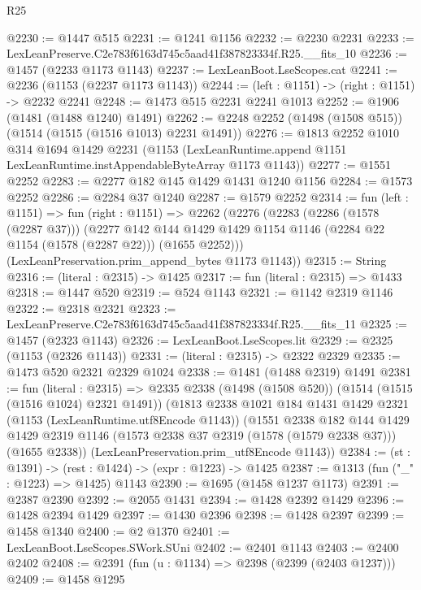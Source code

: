 \begin{lexlean}{R25}
\begin{coremodule}
@2230 := @1447 @515
@2231 := @1241 @1156
@2232 := @2230 @2231
@2233 := LexLeanPreserve.C2e783f6163d745c5aad41f387823334f.R25.__fits_10
@2236 := @1457 (@2233 @1173 @1143)
@2237 := LexLeanBoot.LseScopes.cat
@2241 := @2236 (@1153 (@2237 @1173 @1143))
@2244 := (left : @1151) -> (right : @1151) -> @2232 @2241
@2248 := @1473 @515 @2231 @2241 @1013
@2252 := @1906 (@1481 (@1488 @1240) @1491)
@2262 := @2248 @2252 (@1498 (@1508 @515)) (@1514 (@1515 (@1516 @1013) @2231 @1491))
@2276 := @1813
    @2252
    @1010
    @314
    @1694
    @1429
    @2231
    (@1153 (LexLeanRuntime.append @1151 LexLeanRuntime.instAppendableByteArray @1173 @1143))
@2277 := @1551 @2252
@2283 := @2277 @182 @145 @1429 @1431 @1240 @1156
@2284 := @1573 @2252
@2286 := @2284 @37 @1240
@2287 := @1579 @2252
@2314 := fun (left : @1151) =>
  fun (right : @1151) =>
  @2262
    (@2276
      (@2283
        (@2286 (@1578 (@2287 @37)))
        (@2277
          @142
          @144
          @1429
          @1429
          @1154
          @1146
          (@2284 @22 @1154 (@1578 (@2287 @22)))
          (@1655 @2252)))
      (LexLeanPreservation.prim_append_bytes @1173 @1143))
@2315 := String
@2316 := (literal : @2315) -> @1425
@2317 := fun (literal : @2315) => @1433
@2318 := @1447 @520
@2319 := @524 @1143
@2321 := @1142 @2319 @1146
@2322 := @2318 @2321
@2323 := LexLeanPreserve.C2e783f6163d745c5aad41f387823334f.R25.__fits_11
@2325 := @1457 (@2323 @1143)
@2326 := LexLeanBoot.LseScopes.lit
@2329 := @2325 (@1153 (@2326 @1143))
@2331 := (literal : @2315) -> @2322 @2329
@2335 := @1473 @520 @2321 @2329 @1024
@2338 := @1481 (@1488 @2319) @1491
@2381 := fun (literal : @2315) =>
  @2335
    @2338
    (@1498 (@1508 @520))
    (@1514 (@1515 (@1516 @1024) @2321 @1491))
    (@1813
      @2338
      @1021
      @184
      @1431
      @1429
      @2321
      (@1153 (LexLeanRuntime.utf8Encode @1143))
      (@1551
        @2338
        @182
        @144
        @1429
        @1429
        @2319
        @1146
        (@1573 @2338 @37 @2319 (@1578 (@1579 @2338 @37)))
        (@1655 @2338))
      (LexLeanPreservation.prim_utf8Encode @1143))
@2384 := (st : @1391) -> (rest : @1424) -> (expr : @1223) -> @1425
@2387 := @1313 (fun ("_" : @1223) => @1425) @1143
@2390 := @1695 (@1458 @1237 @1173)
@2391 := @2387 @2390
@2392 := @2055 @1431
@2394 := @1428 @2392 @1429
@2396 := @1428 @2394 @1429
@2397 := @1430 @2396
@2398 := @1428 @2397
@2399 := @1458 @1340
@2400 := @2 @1370
@2401 := LexLeanBoot.LseScopes.SWork.SUni
@2402 := @2401 @1143
@2403 := @2400 @2402
@2408 := @2391 (fun (u : @1134) => @2398 (@2399 (@2403 @1237)))
@2409 := @1458 @1295

\end{coremodule}
\end{lexlean}
